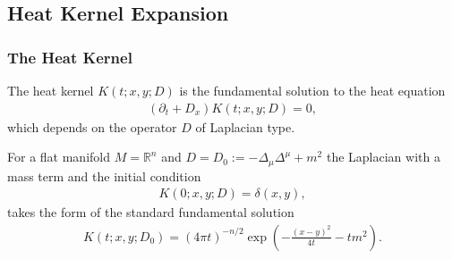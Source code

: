 \subsection{Heat Kernel Expansion\label{sec:4}}
\subsubsection{The Heat Kernel}
The heat kernel $K(t; x, y; D)$ is the fundamental solution to the heat
equation
\begin{align}
    (\partial _t + D_x)K(t;x, y;D) =0,
\end{align}
which depends on the operator $D$ of Laplacian type.

For a flat manifold $M = \mathbb{R}^n$ and $D = D_0 := -\Delta_\mu\Delta^\mu +m^2$ the
Laplacian with a mass term and the initial condition
\begin{align}
    K(0;x,y;D) = \delta(x,y),
\end{align}
takes the form of the standard fundamental solution
\begin{align}\label{eq:standard}
    K(t;x,y;D_0) = (4\pi t)^{-n/2}\exp\left(-\frac{(x-y)^2}{4t}-tm^2\right).
\end{align}

